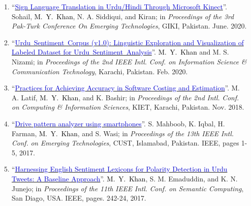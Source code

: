 \documentclass[a4paper, 10pt]{article}
\begin{document}
\begin{enumerate}
\item ``\href{https://dpi.org/10.1088/1757-899x/899/1/012016}{\textcolor{MediumBlue}{Sign Language Translation in Urdu/Hindi Through Microsoft Kinect}}''. Sohail, \textcolor{Black}{M.~Y.~Khan}, N. A. Siddiqui, and Kiran; in \emph{Proceedings of the 3rd Pak-Turk Conference On Emerging Technologies}, GIKI, Pakistan. June. 2020.

\item ``\href{https://doi.org/10.1109/ICISCT49550.2020.9080043}{\textcolor{MediumBlue}{Urdu~Sentiment~Corpus (v1.0): Linguistic Exploration and Visualization of Labeled Dataset for Urdu~Sentiment~Analysis}}''. \textcolor{Black}{M.~Y.~Khan} and M. S. Nizami; in \emph{Proceedings of the 2nd IEEE Intl. Conf. on Information Science \& Communication Technology}, Karachi, Pakistan. Feb. 2020.

\item ``\href{http://kjcis.pafkiet.edu.pk/index.php/kjcis/article/view/13}{\textcolor{MediumBlue}{Practices for Achieving Accuracy in Software Costing and Estimation}}''. M. A. Latif, \textcolor{Black}{M.~Y.~Khan}, and K. Bashir; in \emph{Proceedings of the 2nd Intl. Conf. on Computing \& Information Sciences}, KIET, Karachi, Pakistan. Nov. 2018.

\item ``\href{https://doi.org/10.1109/ICET.2017.8281659}{\textcolor{MediumBlue}{Drive pattern analyzer using smartphones}}''. S. Mahboob, K. Iqbal, H. Farman, \textcolor{Black}{M.~Y.~Khan}, and S. Wasi; in \emph{ Proceedings of the 13th IEEE Intl. Conf. on Emerging Technologies}, CUST, Islamabad, Pakistan. IEEE, pages 1-5, 2017.

\item ``\href{https://doi.org/10.1109/ICSC.2017.68}{\textcolor{MediumBlue}{Harnessing English Sentiment Lexicons for Polarity Detection in Urdu Tweets: A Baseline Approach}}''. \textcolor{Black}{M.~Y.~Khan}, S. M. Emaduddin, and K. N. Junejo; in \emph{Proceedings of the 11th IEEE Intl. Conf. on Semantic Computing}, San Diago, USA. IEEE, pages. 242-24, 2017.
\end{enumerate}
\end{document}
